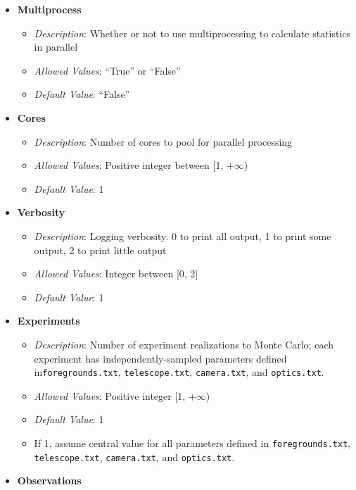 \documentclass[11pt]{article} %
\begin{document}
\begin{itemize}[noitemsep,topsep=0pt]
	\item \textbf{Multiprocess}
		\begin{itemize}[noitemsep,topsep=0pt]
		\item \textit{Description}: Whether or not to use multiprocessing to calculate statistics in parallel
		\item \textit{Allowed Values}: ``True'' or ``False''
		\item \textit{Default Value}: ``False''
		\end{itemize}
	\item \textbf{Cores}
		\begin{itemize}[noitemsep,topsep=0pt]
		\item \textit{Description}: Number of cores to pool for parallel processing
		\item \textit{Allowed Values}: Positive integer between [1, $+\infty$)
		\item \textit{Default Value}: 1
		\end{itemize}
	\item \textbf{Verbosity}
		\begin{itemize}[noitemsep,topsep=0pt]
		\item \textit{Description}: Logging verbosity. 0 to print all output, 1 to print some output, 2 to print little output
		\item \textit{Allowed Values}: Integer between [0, 2]
		\item \textit{Default Value}: 1
		\end{itemize}
	\item \textbf{Experiments}
		\begin{itemize}[noitemsep,topsep=0pt]
		\item \textit{Description}: Number of experiment realizations to Monte Carlo; each experiment has independently-sampled parameters defined in\texttt{foregrounds.txt}, \texttt{telescope.txt}, \texttt{camera.txt}, and \texttt{optics.txt}.
		\item \textit{Allowed Values}: Positive integer [1, $+\infty$)
		\item \textit{Default Value}: 1
		\item If 1, assume central value for all parameters defined in \texttt{foregrounds.txt}, \texttt{telescope.txt}, \texttt{camera.txt}, and \texttt{optics.txt}.
		\end{itemize}
	\item \textbf{Observations}
		\begin{itemize}[noitemsep,topsep=0pt]

\end{itemize}
\end{itemize}
\end{document}
